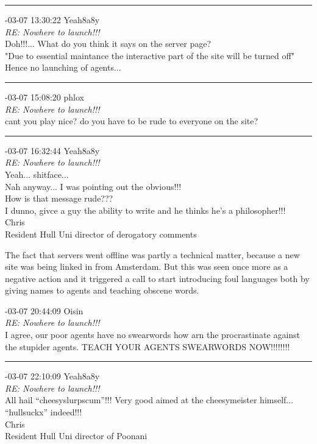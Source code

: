 \begin{mail}
\rule{0.8\textwidth}{.4pt}

{-03-07 13:30:22 Yeah8a8y}\\
{\itshape RE: Nowhere to launch!!!}\\
Doh!!!... What do you think it says on the server page?\\
"Due to essential maintance the interactive part of the site will be turned off"\\
Hence no launching of agents...\\

\rule{0.8\textwidth}{.4pt}

{-03-07 15:08:20 phlox}\\
{\itshape RE: Nowhere to launch!!!}\\
cant you play nice? do you have to be rude to everyone on the site?\\

\rule{0.8\textwidth}{.4pt}

{-03-07 16:32:44 Yeah8a8y}\\
{\itshape RE: Nowhere to launch!!!}\\
Yeah... shitface...\\
Nah anyway... I was pointing out the obvious!!!\\
How is that message rude???\\
I dunno, givce a guy the ability to write and he thinks he's a philosopher!!!\\
Chris\\
Resident Hull Uni director of derogatory comments
\end{mail}

The fact that servers went offline was partly a technical matter, because a new site was being linked in from Amsterdam. 
But this was seen once more as a negative action and it triggered a call to start 
introducing foul languages both by giving names to agents and teaching obscene words. 

\begin{mail}

{-03-07 20:44:09 Oisin}\\
{\itshape RE: Nowhere to launch!!!}\\
I agree, our poor agents have no swearwords how arn the procrastinate against the stupider agents. TEACH YOUR AGENTS SWEARWORDS NOW!!!!!!!! \\

\rule{0.8\textwidth}{.4pt}

{-03-07 22:10:09 Yeah8a8y}\\
{\itshape RE: Nowhere to launch!!!}\\
All hail ``cheesyslurpscum''!!!  Very good aimed at the cheesymeister himself... ``hullsuckx'' indeed!!!\\
Chris\\
Resident Hull Uni director of Poonani

\end{mail}

